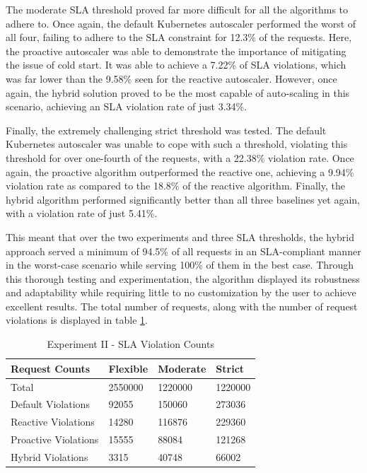 The moderate SLA threshold proved far more difficult for all the algorithms to adhere to. Once again, the default Kubernetes autoscaler performed the worst of all four, failing to adhere to the SLA constraint for 12.3\% of the requests. Here, the proactive autoscaler was able to demonstrate the importance of mitigating the issue of cold start. It was able to achieve a 7.22\% of SLA violations, which was far lower than the 9.58\% seen for the reactive autoscaler. However, once again, the hybrid solution proved to be the most capable of auto-scaling in this scenario, achieving an SLA violation rate of just 3.34\%.

Finally, the extremely challenging strict threshold was tested. The default Kubernetes autoscaler was unable to cope with such a threshold, violating this threshold for over one-fourth of the requests, with a 22.38\% violation rate. Once again, the proactive algorithm outperformed the reactive one, achieving a 9.94\% violation rate as compared to the 18.8\% of the reactive algorithm. Finally, the hybrid algorithm performed significantly better than all three baselines yet again, with a violation rate of just 5.41\%.\par

This meant that over the two experiments and three SLA thresholds, the hybrid approach served a minimum of 94.5\% of all requests in an SLA-compliant manner in the worst-case scenario while serving 100\% of them in the best case. Through this thorough testing and experimentation, the algorithm displayed its robustness and adaptability while requiring little to no customization by the user to achieve excellent results. The total number of requests, along with the number of request violations is displayed in table \ref{tab:exp2-sla-violation-count}.\par

\begin{table}
    \caption{Experiment II - SLA Violation Counts}\label{tab:exp2-sla-violation-count}
    \centering
    \begin{tabular}{|l|l|l|l|}
        \hline
        Request Counts & Flexible & Moderate & Strict \\
        \hline
        Total  & \num[group-separator={,}]{2550000} & \num[group-separator={,}]{1220000} & \num[group-separator={,}]{1220000} \\
        \hline
        Default Violations & \num[group-separator={,}]{92055} & \num[group-separator={,}]{150060} & \num[group-separator={,}]{273036} \\
        Reactive Violations & \num[group-separator={,}]{14280} & \num[group-separator={,}]{116876} & \num[group-separator={,}]{229360} \\
        Proactive Violations & \num[group-separator={,}]{15555} & \num[group-separator={,}]{88084} & \num[group-separator={,}]{121268} \\
        Hybrid Violations & \num[group-separator={,}]{3315} & \num[group-separator={,}]{40748} & \num[group-separator={,}]{66002} \\
         \hline
    \end{tabular}
\end{table}

